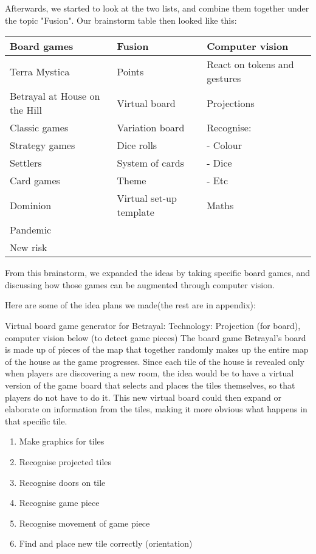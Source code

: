 Afterwards, we started to look at the two lists, and combine them together under the topic "Fusion". Our brainstorm table then looked like this:

\begin{tabular}{l | l | l}
Board games & Fusion & Computer vision\\
\hline
Terra Mystica & Points & React on tokens and gestures\\
Betrayal at House on the Hill &  Virtual board & Projections\\
Classic games & Variation board & Recognise: \\
Strategy games & Dice rolls & - Colour\\
Settlers & System of cards & - Dice\\
Card games & Theme & - Etc\\
Dominion & Virtual set-up template & Maths\\
Pandemic \\
New risk\\
\end{tabular}

From this brainstorm, we expanded the ideas by taking specific board games, and discussing how those games can be augmented through computer vision.


Here are some of the idea plans we made(the rest are in appendix):

Virtual board game generator for Betrayal:
Technology: Projection (for board), computer vision below (to detect game pieces)
The board game Betrayal’s board is made up of pieces of the map that together randomly makes up the entire map of the house as the game progresses. Since each tile of the house is revealed only when players are discovering a new room, the idea would be to have a virtual version of the game board that selects and places the tiles themselves, so that players do not have to do it. This new virtual board could then expand or elaborate on information from the tiles, making it more obvious what happens in that specific tile.
\begin{enumerate}
\item Make graphics for tiles
\item Recognise projected tiles
\item Recognise doors on tile
\item Recognise game piece
\item Recognise movement of game piece
\item Find and place new tile correctly (orientation)
\end{enumerate}



